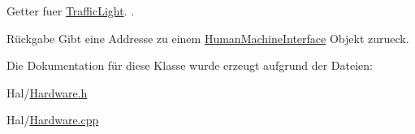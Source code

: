 Getter fuer \hyperlink{class_traffic_light}{Traffic\+Light}. .

\begin{DoxyReturn}{Rückgabe}
Gibt eine Addresse zu einem \hyperlink{class_human_machine_interface}{Human\+Machine\+Interface} Objekt zurueck. 
\end{DoxyReturn}


Die Dokumentation für diese Klasse wurde erzeugt aufgrund der Dateien\+:\begin{DoxyCompactItemize}
\item 
Hal/\hyperlink{_hardware_8h}{Hardware.\+h}\item 
Hal/\hyperlink{_hardware_8cpp}{Hardware.\+cpp}\end{DoxyCompactItemize}
